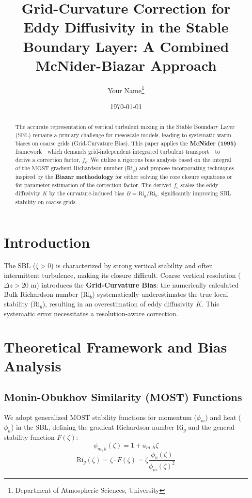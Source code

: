 \documentclass[12pt, a4paper]{article}
\title{Grid-Curvature Correction for Eddy Diffusivity in the Stable Boundary Layer: A Combined McNider-Biazar Approach}
\author{Your Name\thanks{Department of Atmospheric Sciences, University}}
\date{\today}
\begin{document}
\maketitle

\begin{abstract}
The accurate representation of vertical turbulent mixing in the Stable Boundary Layer (SBL) remains a primary challenge for mesoscale models, leading to systematic warm biases on coarse grids (Grid-Curvature Bias). This paper applies the \textbf{McNider (1995)} framework—which demands grid-independent integrated turbulent transport—to derive a correction factor, $f_c$. We utilize a rigorous bias analysis based on the integral of the $\text{MOST}$ gradient Richardson number ($\text{Ri}_g$) and propose incorporating techniques inspired by the \textbf{Biazar methodology} for either solving the core closure equations or for parameter estimation of the correction factor. The derived $f_c$ scales the eddy diffusivity $K$ by the curvature-induced bias $B = \text{Ri}_g / \text{Ri}_b$, significantly improving SBL stability on coarse grids.
\end{abstract}

\section{Introduction}

The SBL ($\zeta > 0$) is characterized by strong vertical stability and often intermittent turbulence, making its closure difficult. Coarse vertical resolution ($\Delta z > 20 \text{ m}$) introduces the \textbf{Grid-Curvature Bias}: the numerically calculated Bulk Richardson number ($\text{Ri}_b$) systematically underestimates the true local stability ($\text{Ri}_g$), resulting in an overestimation of eddy diffusivity $K$. This systematic error necessitates a resolution-aware correction.

\section{Theoretical Framework and Bias Analysis}

\subsection{Monin-Obukhov Similarity (MOST) Functions}
We adopt generalized $\text{MOST}$ stability functions for momentum ($\phi_m$) and heat ($\phi_h$) in the SBL, defining the gradient Richardson number $\text{Ri}_g$ and the general stability function $F(\zeta)$:
$$ \phi_{m,h}(\zeta) = 1 + a_{m,h}\zeta $$
$$ \text{Ri}_g(\zeta) = \zeta \cdot F(\zeta) = \zeta \frac{\phi_h(\zeta)}{\phi_m(\zeta)^2} $$
\end{document}
